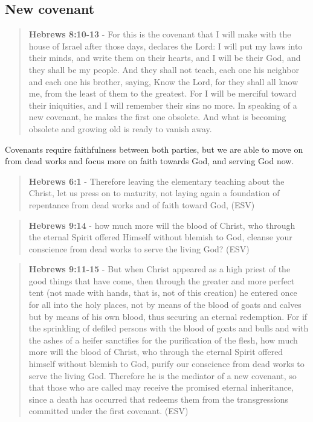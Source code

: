 \documentclass[11pt]{article}
\begin{document}
\subsection{New covenant}
\label{sec:org4cad239}
\begin{quote}
\textbf{Hebrews 8:10-13} - For this is the covenant that I will make with the house of Israel after those days, declares the Lord: I will put my laws into their minds, and write them on their hearts, and I will be their God, and they shall be my people. And they shall not teach, each one his neighbor and each one his brother, saying, Know the Lord, for they shall all know me, from the least of them to the greatest. For I will be merciful toward their iniquities, and I will remember their sins no more. In speaking of a new covenant, he makes the first one obsolete. And what is becoming obsolete and growing old is ready to vanish away.
\end{quote}

Covenants require faithfulness between both parties, but we are able to move on from dead works and focus more on faith towards God, and serving God now.

\begin{quote}
\textbf{Hebrews 6:1} - Therefore leaving the elementary teaching about the Christ, let us press on to maturity, not laying again a foundation of repentance from dead works and of faith toward God, (ESV)
\end{quote}

\begin{quote}
\textbf{Hebrews 9:14} - how much more will the blood of Christ, who through the eternal Spirit offered Himself without blemish to God, cleanse your conscience from dead works to serve the living God? (ESV)
\end{quote}

\begin{quote}
\textbf{Hebrews 9:11-15} - But when Christ appeared as a high priest of the good things that have come, then through the greater and more perfect tent (not made with hands, that is, not of this creation) he entered once for all into the holy places, not by means of the blood of goats and calves but by means of his own blood, thus securing an eternal redemption. For if the sprinkling of defiled persons with the blood of goats and bulls and with the ashes of a heifer sanctifies for the purification of the flesh, how much more will the blood of Christ, who through the eternal Spirit offered himself without blemish to God, purify our conscience from dead works to serve the living God. Therefore he is the mediator of a new covenant, so that those who are called may receive the promised eternal inheritance, since a death has occurred that redeems them from the transgressions committed under the first covenant. (ESV)
\end{quote}
\end{document}
